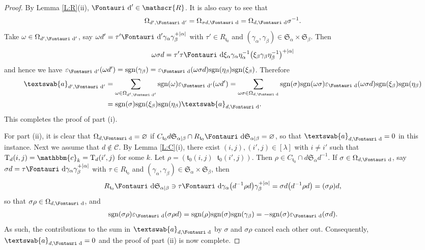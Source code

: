 \documentclass[pdftex]{sigma}
\renewcommand{\t}{\mathfrak{t}}
\renewcommand{\a}{\textswab{a}}
\newcommand{\T}{\mathrm{T}}
\newcommand{\sgn}{\mathrm{sgn}}
\newcommand{\sym}[1]{\mathfrak{S}_{#1}}
\newcommand{\bb}[1]{\mathbbm{{#1}}}
\newcommand{\R}{\mathscr{R}}
\newcommand{\C}{\mathscr{C}}
\newcommand{\dR}{\text{\Fontauri d}}
\newcommand{\e}{\varepsilon}
\begin{document}
\begin{proof} By Lemma \ref{L:R}(ii), $\dR' \in \R$. It is also easy to see that \begin{gather*}\Omega_{d',\dR'} = \Omega_{\sigma d,\dR}= \Omega_{d,\dR}\sigma^{-1}.\end{gather*} Take $\omega \in \Omega_{d',\dR'}$, say $\omega d'=\tau' \dR'\gamma_\alpha\gamma_\beta^{+|\alpha|}$ with $\tau'\in R_{\t_0}$ and $(\gamma_\alpha,\gamma_\beta) \in \sym{\alpha} \times \sym{\beta}$. Then \begin{gather*}\omega \sigma d=\tau' \tau \dR \xi_{\alpha}\gamma_\alpha\eta_{\alpha}^{-1}\big(\xi_\beta\gamma_\beta \eta_\beta^{-1}\big)^{+|\alpha|}\end{gather*} and hence we have $\e_{\dR'}(\omega d')=\sgn(\gamma_\beta)=\e_{\dR}(\omega \sigma d)\sgn(\eta_\beta)\sgn(\xi_\beta)$. Therefore{\samepage
\begin{align*}
\a_{d',\dR'} &= \sum_{\omega \in \Omega_{d',\dR'}} \sgn(\omega) \e_{\dR'}(\omega d')
= \sum_{\omega\sigma \in \Omega_{d,\dR}} \sgn(\sigma)\sgn(\omega\sigma) \e_{\dR}(\omega\sigma d)\sgn(\xi_{\beta})\sgn(\eta_{\beta}) \\
&= \sgn(\sigma)\sgn(\xi_{\beta})\sgn(\eta_{\beta}) \a_{d,\dR}.
\end{align*} This completes the proof of part (i).}

For part (ii), it is clear that $\Omega_{d,\dR} = \varnothing$ if $C_{\t_0}d\sym{\alpha|\beta} \cap R_{\t_0} \dR \sym{\alpha|\beta} = \varnothing$, so that $\a_{d,\dR} = 0$ in this instance. Next we assume that $d \notin \C$. By Lemma \ref{L:C}(i), there exist $(i,j), (i',j) \in [\lambda]$ with $i\ne i'$ such that $\T_d(i,j) = \bb{c}_k = \T_d(i',j)$ for some $k$. Let $\rho = (\t_0(i,j) \;\; \t_0(i',j))$. Then $\rho \in C_{\t_0} \cap d\sym{\alpha} d^{-1}$. If $\sigma \in \Omega_{d,\dR}$, say $\sigma d = \tau \dR \gamma_\alpha \gamma_\beta^{+|\alpha|}$ with $\tau \in R_{\t_0}$ and $(\gamma_\alpha,\gamma_\beta) \in \sym{\alpha} \times \sym{\beta}$, then
\begin{gather*}
R_{\t_0} \dR \sym{\alpha|\beta} \ni \tau \dR \gamma_{\alpha} \big(d^{-1}\rho d\big) \gamma_{\beta}^{+|\alpha|} = \sigma d \big(d^{-1}\rho d\big) = (\sigma \rho) d, \end{gather*}
so that $\sigma \rho \in \Omega_{d,\dR}$, and
\begin{gather*}
\sgn(\sigma \rho) \e_{\dR}(\sigma \rho d) = \sgn(\rho)\sgn(\sigma)\sgn(\gamma_\beta)= - \sgn(\sigma) \e_{\dR}(\sigma d).
\end{gather*}
As such, the contributions to the sum in $\a_{d,\dR}$ by $\sigma$ and $\sigma \rho$ cancel each other out. Consequently, $\a_{d,\dR} = 0$ and the proof of part (ii) is now complete.


\end{proof}
\end{document}
